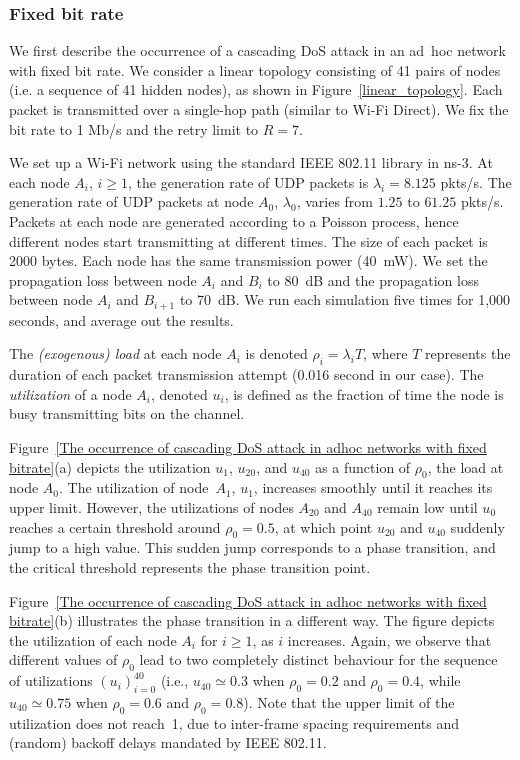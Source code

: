 \documentclass{IEEEtran}
\begin{document}
\subsubsection{Fixed bit rate}
\label{EXP:Fixed bitrate}
We first describe the occurrence of a cascading DoS attack in an
ad~hoc network with fixed bit rate. We consider a linear topology
consisting of 41 pairs of nodes (i.e. a sequence of 41 hidden nodes), as shown in Figure~\ref{linear_topology}.
Each packet is transmitted over a single-hop path (similar to Wi-Fi Direct).
We fix the bit rate to 1 Mb/s and the retry limit to $R=7$.


We set up a Wi-Fi network using the standard IEEE 802.11 library in ns-3.  At each node $A_i$, $i \geq 1$,
 the generation rate of UDP packets is $\lambda_i=8.125$ pkts/s. The
generation rate of UDP packets at node $A_0$, $\lambda_0$, varies from $1.25$ to $61.25$
pkts/s. Packets at each node are generated according to a Poisson process, hence different nodes start transmitting at different times.
The size
of each packet is 2000 bytes. Each node has the same transmission power
(40~mW).
We set the propagation loss between node $A_i$ and $B_i$ to
80~dB and the propagation loss between node $A_i$ and $B_{i+1}$
to 70~dB.
We run each simulation five times for 1,000 seconds, and average out the results.

The \emph{(exogenous) load} at each node $A_i$ is denoted $\rho_i=\lambda_i T$, where $T$ represents the duration of each packet transmission
attempt (0.016 second in our case).
The \emph{utilization} of a node $A_i$, denoted $u_i$, is defined as the
fraction of time the node is busy transmitting bits on the channel.






Figure~\ref{The occurrence of cascading DoS attack in adhoc networks  with fixed bitrate}(a) depicts the utilization
$u_1$, $u_{20}$, and $u_{40}$ as a function of
$\rho_0$, the load at node $A_0$. The utilization of node~$A_1$, $u_1$, increases smoothly until it reaches its
upper limit. However, the
utilizations of nodes $A_{20}$ and $A_{40}$  remain low until $u_0$ reaches a certain
threshold around $\rho_0 = 0.5$, at which point $u_{20}$ and $u_{40}$ suddenly jump
to a high value.  This sudden jump corresponds to a phase transition, and the critical threshold represents the phase transition point.



Figure~\ref{The occurrence of cascading DoS attack in adhoc networks  with fixed bitrate}(b) illustrates the phase transition in a different way.
The figure depicts the
utilization of each node $A_i$ for $i \geq 1$, as $i$ increases. Again, we observe that different values of
$\rho_0$ lead to two completely distinct behaviour for the sequence of
utilizations $(u_i)_{i=0}^{40}$ (i.e., $u_{40} \simeq 0.3$ when $\rho_0 = 0.2$ and $\rho_0 = 0.4$, while
$u_{40} \simeq 0.75$ when $\rho_0 = 0.6$ and $\rho_0 = 0.8$). 
 Note that the upper limit of the utilization does not reach~1,
due to inter-frame spacing requirements  and (random) backoff delays mandated by IEEE 802.11. 
\end{document}
